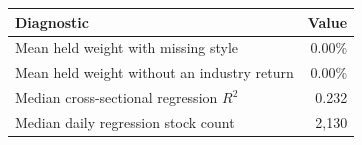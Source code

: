 \begin{tabular}{lr}
\toprule
Diagnostic & Value \\
\midrule
Mean held weight with missing style & 0.00\% \\
Mean held weight without an industry return & 0.00\% \\
Median cross-sectional regression $R^2$ & 0.232 \\
Median daily regression stock count & 2,130 \\
\bottomrule
\end{tabular}
